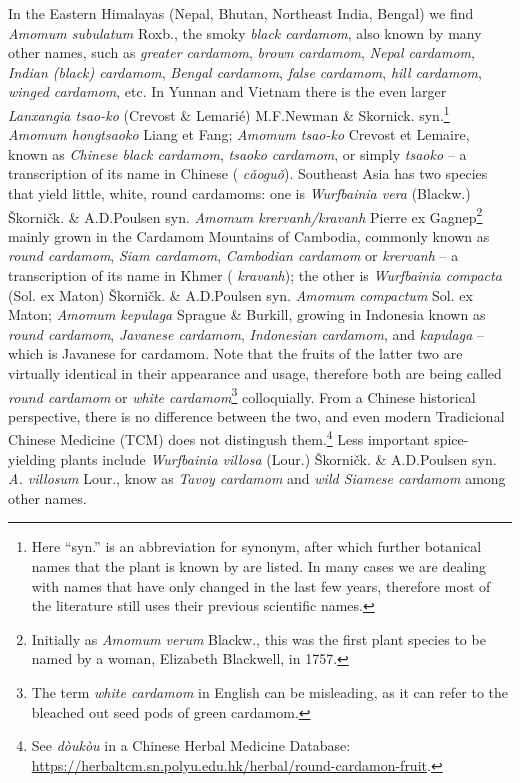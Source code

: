 \documentclass[12pt]{article}
\newcommand{\tc}[1]{\traditionalchinesefont{#1}\rmfamily}
\newcommand{\km}[1]{\khmerfont{#1}\rmfamily}
\newcommand{\jv}[1]{\javanesefont{#1}\rmfamily}
\begin{document}
In the Eastern Himalayas (Nepal, Bhutan, Northeast India, Bengal) we find \textit{Amomum subulatum} Roxb., the smoky \textit{black cardamom}, also known by many other names, such as \textit{greater cardamom}, \textit{brown cardamom}, \textit{Nepal cardamom}, \textit{Indian (black) cardamom}, \textit{Bengal cardamom}, \textit{false cardamom}, \textit{hill cardamom}, \textit{winged cardamom}, etc. In Yunnan and Vietnam there is the even larger \textit{Lanxangia tsao-ko} (Crevost \& Lemarié) M.F.Newman \& Skornick. syn.\footnote{Here ``syn.'' is an abbreviation for synonym, after which further botanical names that the plant is known by are listed. In many cases we are dealing with names that have only changed in the last few years, therefore most of the literature still uses their previous scientific names.} \textit{Amomum hongtsaoko} Liang et Fang; \textit{Amomum tsao-ko} Crevost et Lemaire, known as \textit{Chinese black cardamom}, \textit{tsaoko cardamom}, or simply \textit{tsaoko} -- a transcription of its name in Chinese (\tc{草果} \textit{cǎoguǒ}). Southeast Asia has two species that yield little, white, round cardamoms: one is \textit{Wurfbainia vera} (Blackw.) Škorničk. \& A.D.Poulsen syn. \textit{Amomum krervanh/kravanh} Pierre ex Gagnep\footnote{Initially as \textit{Amomum verum} Blackw., this was the first plant species to be named by a woman, Elizabeth Blackwell, in 1757.} mainly grown in the Cardamom Mountains of Cambodia, commonly known as \textit{round cardamom}, \textit{Siam cardamom}, \textit{Cambodian cardamom} or \textit{krervanh} -- a transcription of its name in Khmer (\km{ក្រវាញ} \textit{kravanh}); the other is \textit{Wurfbainia compacta} (Sol. ex Maton) Škorničk. \& A.D.Poulsen syn. \textit{Amomum compactum} Sol. ex Maton; \textit{Amomum kepulaga} Sprague \& Burkill, growing in Indonesia known as \textit{round cardamom}, \textit{Javanese cardamom}, \textit{Indonesian cardamom}, and \textit{kapulaga} -- which is Javanese for cardamom.
Note that the fruits of the latter two are virtually identical in their appearance and usage, therefore both are being called \textit{round cardamom} or \textit{white cardamom}\footnote{The term \textit{white cardamom} in English can be misleading, as it can refer to the bleached out seed pods of green cardamom.} colloquially. From a Chinese historical perspective, there is no difference between the two, and even modern Tradicional Chinese Medicine (TCM) does not distingush them.\footnote{See \textit{dòukòu} in a Chinese Herbal Medicine Database: \url{https://herbaltcm.sn.polyu.edu.hk/herbal/round-cardamon-fruit}.} Less important spice-yielding plants include \textit{Wurfbainia villosa} (Lour.) Škorničk. \& A.D.Poulsen syn. \textit{A. villosum} Lour., know as \textit{Tavoy cardamom} and \textit{wild Siamese cardamom} among other names. 
\end{document}
